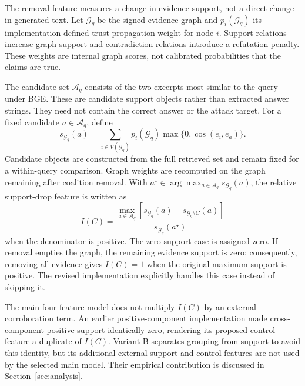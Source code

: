 \documentclass[sigconf]{acmart}
\newif\ifrevisionnotes
\newcommand{\verification}[1]{%
  \ifrevisionnotes
    \par\smallskip\noindent
    {\small\color{red!65!black}\textbf{Verification pending.} #1}\par\smallskip
  \fi}
\begin{document}
The removal feature measures a change in evidence support, not a direct change in generated text. Let $\mathcal{G}_q$ be the signed evidence graph and $p_i(\mathcal{G}_q)$ its implementation-defined trust-propagation weight for node $i$. Support relations increase graph support and contradiction relations introduce a refutation penalty. These weights are internal graph scores, not calibrated probabilities that the claims are true.

The candidate set $\mathcal{A}_q$ consists of the two excerpts most similar to the query under BGE. These are candidate support objects rather than extracted answer strings. They need not contain the correct answer or the attack target. For a fixed candidate $a\in\mathcal{A}_q$, define
\begin{equation}
 s_{\mathcal{G}_q}(a)=\sum_{i\in V(\mathcal{G}_q)}
 p_i(\mathcal{G}_q)\max\{0,\cos(e_i,e_a)\}.
 \label{eq:support}
\end{equation}
Candidate objects are constructed from the full retrieved set and remain fixed for a within-query comparison. Graph weights are recomputed on the graph remaining after coalition removal. With
$a^\star\in\arg\max_{a\in\mathcal{A}_q}s_{\mathcal{G}_q}(a)$,
the relative support-drop feature is written as
\begin{equation}
 I(C)=
 \frac{\displaystyle\max_{a\in\mathcal{A}_q}
 \left[s_{\mathcal{G}_q}(a)-s_{\mathcal{G}_q\setminus C}(a)\right]}
 {s_{\mathcal{G}_q}(a^\star)}
 \label{eq:impact}
\end{equation}
when the denominator is positive. The zero-support case is assigned zero. If removal empties the graph, the remaining evidence support is zero; consequently, removing all evidence gives $I(C)=1$ when the original maximum support is positive. The revised implementation explicitly handles this case instead of skipping it.

\verification{The support-drop formulation is retained from the supplied manuscript and aligned with the verified empty-graph correction. Confirm the exact trust update, initialization, normalization, iteration count, numerical tolerance, clipping, and candidate-freezing behavior against the frozen implementation before submission. Do not infer these details from the reported aggregate scores.}

The main four-feature model does not multiply $I(C)$ by an external-corroboration term. An earlier positive-component implementation made cross-component positive support identically zero, rendering its proposed control feature a duplicate of $I(C)$. Variant B separates grouping from support to avoid this identity, but its additional external-support and control features are not used by the selected main model. Their empirical contribution is discussed in Section~\ref{sec:analysis}.
\end{document}

